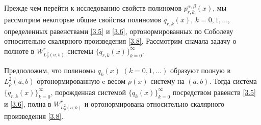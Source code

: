 Прежде чем  перейти к исследованию свойств полиномов $p_{r,k}^{\alpha,\beta}(x)$, мы рассмотрим некоторые общие свойства  полиномов $q_{r,k}(x)$, $k=0,1,\ldots$, определенных равенствами \eqref{3.5} и \eqref{3.6},  ортонормированных по Соболеву относительно скалярного произведения \eqref{3.8}. Рассмотрим сначала задачу о полноте в $W^r_{L^2_\rho(a,b)}$ системы $\{q_{r,k}(x)\}_{k=0}^\infty$.

\begin{state} 
Предположим, что полиномы $q_k(x)$ $(k=0,1,\ldots)$ образуют полную в $L^2_\rho(a,b)$ ортонормированную   c весом   $\rho(x)$ систему на  $(a,b)$. Тогда система $\{q_{r,k}(x)\}_{k=0}^\infty$, порожденная системой $\{q_{k}(x)\}_{k=0}^\infty$ посредством равенств \eqref{3.5} и \eqref{3.6}, полна  в $W^r_{L^2_\rho(a,b)}$ и ортонормирована относительно скалярного произведения \eqref{3.8}.
\end{state}



